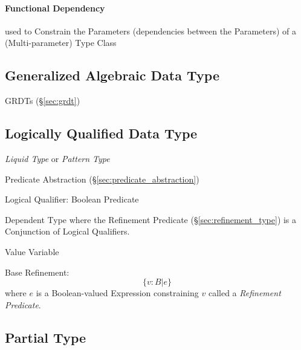 \paragraph{Functional Dependency}\label{sec:functional_dependency}\hfill

used to Constrain the Parameters (dependencies between the Parameters)
of a (Multi-parameter) Type Class




\subsection{Generalized Algebraic Data Type}\label{sec:gadt}

\fist GRDTs (\S\ref{sec:grdt})



\subsection{Logically Qualified Data Type}\label{sec:logically_qualified}

\cite{rondon-kawaguchi-jhala08}

\emph{Liquid Type} or \emph{Pattern Type}

Predicate Abstraction (\S\ref{sec:predicate_abstraction})

Logical Qualifier: Boolean Predicate

Dependent Type where the Refinement Predicate
(\S\ref{sec:refinement_type}) is a Conjunction of Logical Qualifiers.

Value Variable

Base Refinement:
\[
  \{ v : B | e \}
\]
where $e$ is a Boolean-valued Expression constraining $v$ called a
\emph{Refinement Predicate}.



\subsection{Partial Type}\label{sec:partial_type}

